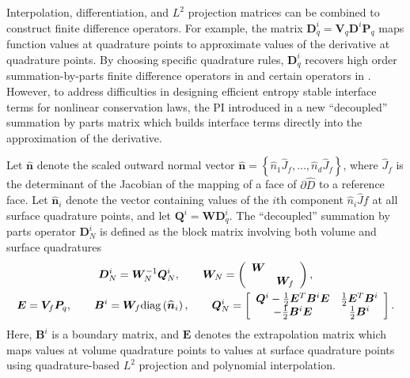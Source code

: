 \documentclass{svjour3}                     %
\renewcommand{\hat}{\widehat}
\newcommand{\diag}[1]{{\rm diag}\LRp{#1}}
\newcommand{\LRp}[1]{\left( #1 \right)}
\newcommand{\LRs}[1]{\left[ #1 \right]}
\newcommand{\LRc}[1]{\left\{ #1 \right\}}
\begin{document}
Interpolation, differentiation, and $L^2$ projection matrices can be combined to construct finite difference operators.  For example, the matrix $\bm{D}^i_q = \bm{V}_q\bm{D}^i\bm{P}_q$ maps function values at quadrature points to approximate values of the derivative at quadrature points.  By choosing specific quadrature rules, $\bm{D}^i_q$ recovers high order summation-by-parts finite difference operators in \cite{gassner2013skew, fernandez2014generalized, ranocha2018generalised} and certain operators in \cite{hicken2016multidimensional}.  However, to address difficulties in designing efficient entropy stable interface terms for nonlinear conservation laws, the PI introduced in \cite{chan2017discretely} a new ``decoupled'' summation by parts matrix which builds interface terms directly into the approximation of the derivative.  

Let $\hat{\bm{n}}$ denote the scaled outward normal vector $\hat{\bm{n}} = \LRc{\hat{n}_1\hat{J}_f,\ldots,\hat{n}_d\hat{J}_f}$, where $\hat{J}_f$ is the determinant of the Jacobian of the mapping of a face of $\partial \hat{D}$ to a reference face.  Let $\hat{\bm{n}}_i$ denote the vector containing values of the $i$th component $\hat{n}_i\hat{J}f$ at all surface quadrature points, and let $\bm{Q}^i = \bm{W}\bm{D}^i_q$.  The ``decoupled'' summation by parts operator $\bm{D}^i_N$ is defined as the block matrix involving both volume and surface quadratures
\begin{gather}
\bm{D}^i_N = \bm{W}_N^{-1} \bm{Q}^i_N, \qquad \bm{W}_N = \LRp{\begin{array}{cc}\bm{W}&\\ & \bm{W}_f\end{array}}, \label{eq:QN}\\
\bm{E} = \bm{V}_f\bm{P}_q, \qquad \bm{B}^i = \bm{W}_f \diag{\hat{\bm{n}}_i}, \qquad \bm{Q}^i_N  = \LRs{
\begin{array}{cc}
\bm{Q}^i - \frac{1}{2}\bm{E}^T\bm{B}^i\bm{E} &  \frac{1}{2}\bm{E}^T\bm{B}^i\\
-\frac{1}{2}\bm{B}^i\bm{E} & \frac{1}{2} \bm{B}^i
\end{array}}.  \nonumber
\end{gather}
Here, $\bm{B}^i$ is a boundary matrix, and $\bm{E}$ denotes the extrapolation matrix which maps values at volume quadrature points to values at surface quadrature points using quadrature-based $L^2$ projection and polynomial interpolation.  
\end{document}
